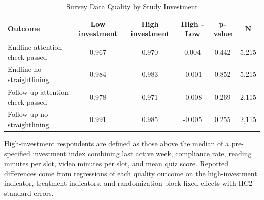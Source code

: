 \begin{table}[H]
\centering
\caption{Survey Data Quality by Study Investment}
\label{tab:data_quality_by_investment}
\footnotesize
\begin{threeparttable}
\begin{tabular}{lccccc}
\toprule
Outcome & Low investment & High investment & High - Low & p-value & N \\
\midrule
Endline attention check passed & 0.967 & 0.970 & 0.004 & 0.442 & 5,215 \\
Endline no straightlining & 0.984 & 0.983 & -0.001 & 0.852 & 5,215 \\
Follow-up attention check passed & 0.978 & 0.971 & -0.008 & 0.269 & 2,115 \\
Follow-up no straightlining & 0.991 & 0.985 & -0.005 & 0.255 & 2,115 \\
\bottomrule
\end{tabular}
\begin{tablenotes}[flushleft]
\footnotesize
\item High-investment respondents are defined as those above the median of a pre-specified investment index combining last active week, compliance rate, reading minutes per slot, video minutes per slot, and mean quiz score. Reported differences come from regressions of each quality outcome on the high-investment indicator, treatment indicators, and randomization-block fixed effects with HC2 standard errors.
\end{tablenotes}
\end{threeparttable}
\end{table}
